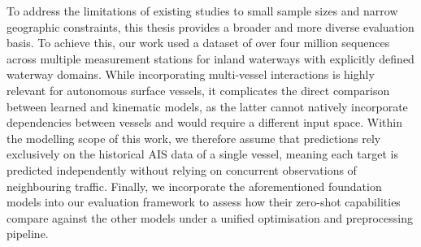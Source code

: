 To address the limitations of existing studies to small sample sizes and narrow geographic constraints, this thesis provides a broader and more diverse evaluation basis. To achieve this, our work used a dataset of over four million sequences across multiple measurement stations for inland waterways with explicitly defined waterway domains. 
While incorporating multi-vessel interactions is highly relevant for autonomous surface vessels, it complicates the direct comparison between learned and kinematic models, as the latter cannot natively incorporate dependencies between vessels and would require a different input space. 
Within the modelling scope of this work, we therefore assume that predictions rely exclusively on the historical \ac{AIS} data of a single vessel, meaning each target is predicted independently without relying on concurrent observations of neighbouring traffic. %
Finally, we incorporate the aforementioned foundation models into our evaluation framework to assess how their zero-shot capabilities compare against the other models under a unified optimisation and preprocessing pipeline.



